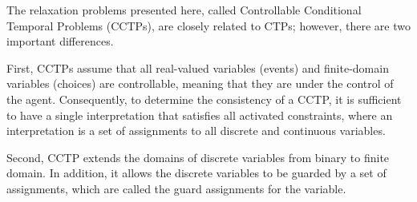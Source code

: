 \documentclass[jair,twoside,11pt,theapa]{article}
\begin{document}
The relaxation problems presented here, called Controllable Conditional Temporal Problems
(CCTPs), are closely related to CTPs; however, there are two important
differences. 


First, CCTPs assume that all real-valued variables (events) and finite-domain
variables (choices) are controllable, meaning that they are under the control of the agent. Consequently, to determine the consistency
of a CCTP, it is sufficient to have a single interpretation that satisfies all
activated constraints, where an interpretation is a set of assignments to all discrete and
continuous variables.


%
%

Second, CCTP extends the domains of discrete variables from binary to finite
domain. In addition, it allows the discrete variables to be guarded by a set of assignments, which are called the guard assignments for the variable.


%
\end{document}
